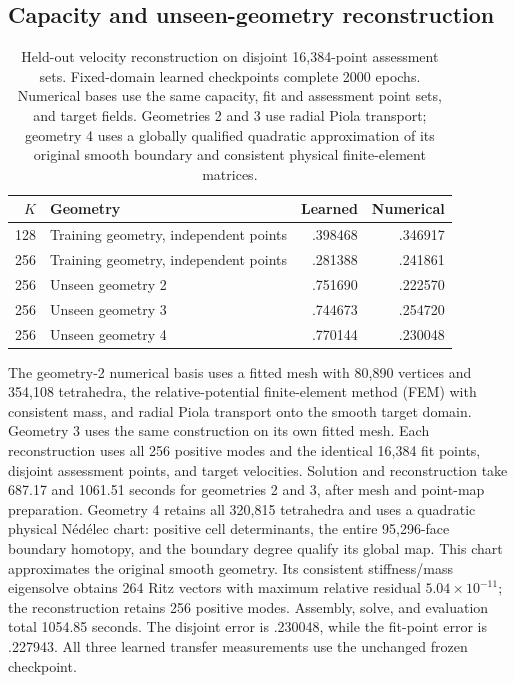 \subsection{Capacity and unseen-geometry reconstruction}
\label{app:unseen-geometry}
\begin{table}[!htb]
\centering\small
\caption{Held-out velocity reconstruction on disjoint 16,384-point assessment sets. Fixed-domain learned checkpoints complete 2000 epochs. Numerical bases use the same capacity, fit and assessment point sets, and target fields. Geometries 2 and 3 use radial Piola transport; geometry 4 uses a globally qualified quadratic approximation of its original smooth boundary and consistent physical finite-element matrices.}
\begin{tabular}{rlrr}\toprule
$K$ & Geometry & Learned & Numerical\\\midrule
128 &Training geometry, independent points&.398468&.346917\\
256 &Training geometry, independent points&.281388&.241861\\
256 &Unseen geometry 2&.751690&.222570\\
256 &Unseen geometry 3&.744673&.254720\\
256 &Unseen geometry 4&.770144&.230048\\\bottomrule
\end{tabular}
\end{table}
The geometry-2 numerical basis uses a fitted mesh with 80,890 vertices and 354,108 tetrahedra, the relative-potential finite-element method (FEM) with consistent mass, and radial Piola transport onto the smooth target domain. Geometry 3 uses the same construction on its own fitted mesh. Each reconstruction uses all 256 positive modes and the identical 16,384 fit points, disjoint assessment points, and target velocities. Solution and reconstruction take 687.17 and 1061.51 seconds for geometries 2 and 3, after mesh and point-map preparation. Geometry 4 retains all 320,815 tetrahedra and uses a quadratic physical N\'ed\'elec chart: positive cell determinants, the entire 95,296-face boundary homotopy, and the boundary degree qualify its global map. This chart approximates the original smooth geometry. Its consistent stiffness/mass eigensolve obtains 264 Ritz vectors with maximum relative residual $5.04\times10^{-11}$; the reconstruction retains 256 positive modes. Assembly, solve, and evaluation total 1054.85 seconds. The disjoint error is .230048, while the fit-point error is .227943. All three learned transfer measurements use the unchanged frozen checkpoint.

